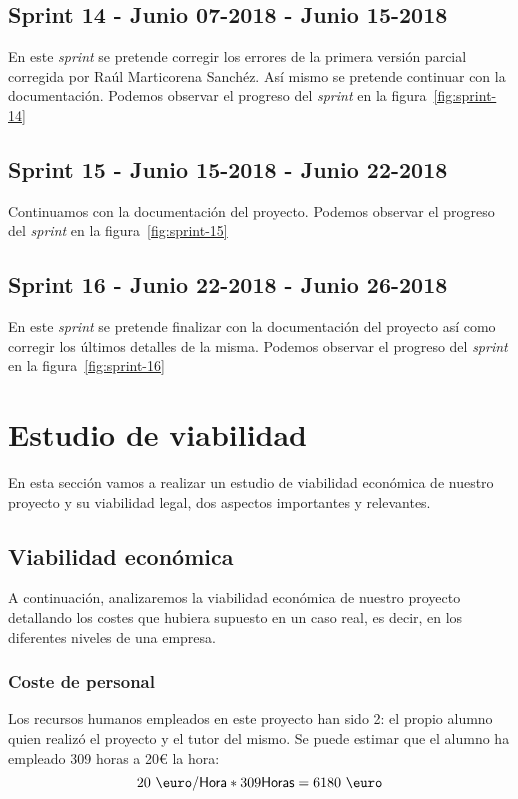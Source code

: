 \subsection{Sprint 14 - Junio 07-2018 - Junio 15-2018}
En este \textit{sprint} se pretende corregir los errores de la primera versión parcial corregida por Raúl Marticorena Sanchéz. Así mismo se pretende continuar con la documentación.
Podemos observar el progreso del \textit{sprint} en la figura~\ref{fig:sprint-14}
\subsection{Sprint 15 - Junio 15-2018 - Junio 22-2018}
Continuamos con la documentación del proyecto.
Podemos observar el progreso del \textit{sprint} en la figura~\ref{fig:sprint-15}

\subsection{Sprint 16 - Junio 22-2018 - Junio 26-2018}
En este \textit{sprint} se pretende finalizar con la documentación del proyecto así como corregir los últimos detalles de la misma.
Podemos observar el progreso del \textit{sprint} en la figura~\ref{fig:sprint-16}
\section{Estudio de viabilidad}
En esta sección vamos a realizar un estudio de viabilidad económica de nuestro proyecto y su viabilidad legal, dos aspectos importantes y relevantes.
\subsection{Viabilidad económica}
A continuación, analizaremos la viabilidad económica de nuestro proyecto detallando los costes que hubiera supuesto en un caso real, es decir,  en los diferentes niveles de una empresa.
\subsubsection{Coste de personal}
Los recursos humanos empleados en este proyecto han sido 2: el propio alumno quien realizó el proyecto y el tutor del mismo. Se puede estimar que el alumno ha empleado 309 horas a 20\euro{} la hora:
\[20~{\mbox{\euro}} /\textsf{Hora}* 309\textsf{Horas}=6180~{\mbox{\euro}} \]

